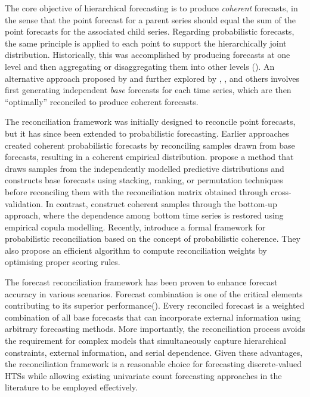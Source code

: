 \documentclass[a4paper,review,12pt,authoryear]{elsarticle}
\begin{document}
The core objective of hierarchical forecasting is to produce \textit{coherent} forecasts, 
in the sense that the point forecast for a parent series should equal the sum of the point forecasts for the associated child series. 
Regarding probabilistic forecasts, the same principle is applied to each point to support the hierarchically joint distribution.
Historically, this was accomplished by producing forecasts at one level 
and then aggregating or disaggregating them into other levels (\citealp{fliednerHierarchicalForecastingIssues2001}). 
An alternative approach proposed by \cite{hyndmanOptimalCombinationForecasts2011} and further explored by \cite{wickramasuriyaOptimalForecastReconciliation2019}, \cite{ anagiotelisForecastReconciliationGeometric2021}, and others involves 
first generating independent \textit{base} forecasts for each time series, 
which are then ``optimally'' reconciled to produce coherent forecasts.

The reconciliation framework was initially designed to reconcile point forecasts, but it has since been extended to probabilistic forecasting. 
Earlier approaches created coherent probabilistic forecasts by reconciling samples drawn from base forecasts, resulting in a coherent empirical distribution.
\cite{jeonProbabilisticForecastReconciliation2019} propose a method that draws samples from the independently modelled predictive distributions and constructs base forecasts using stacking, ranking, or permutation techniques before reconciling them with the reconciliation matrix obtained through cross-validation.
In contrast, \cite{bentaiebHierarchicalProbabilisticForecasting2020} construct coherent samples through the bottom-up approach, 
where the dependence among bottom time series is restored using empirical copula modelling.
Recently, \cite{panagiotelisProbabilisticForecastReconciliation2022} introduce a formal framework for probabilistic reconciliation based on the concept of probabilistic coherence. 
They also propose an efficient algorithm to compute reconciliation weights by optimising proper scoring rules. 

The forecast reconciliation framework has been proven to enhance forecast accuracy in various scenarios. 
Forecast combination is one of the critical elements contributing to its superior performance(\citealp{hollymanUnderstandingForecastReconciliation2021}). 
Every reconciled forecast is a weighted combination of all base forecasts that
can incorporate external information using arbitrary forecasting methods.
More importantly, the reconciliation process avoids the requirement for complex models that  simultaneously capture hierarchical constraints, external information, and serial dependence.
Given these advantages, the reconciliation framework is a reasonable choice for forecasting discrete-valued HTSs while allowing existing univariate count forecasting approaches in the literature to be employed effectively.
\end{document}
